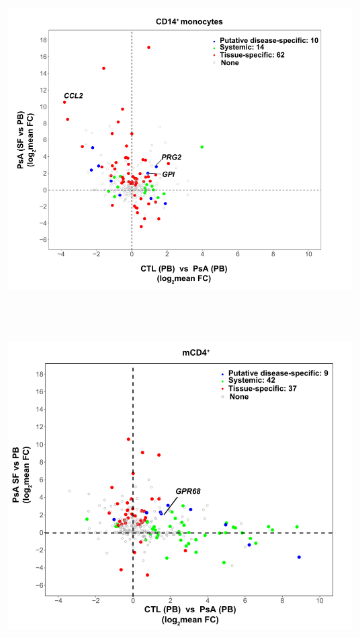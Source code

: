\begin{figure}[htbp]
\centering
\begin{subfigure}{0.6\textwidth}
\centering
\includegraphics[width=\textwidth]{./Results3/pdfs/PSA_array_correlation_CD14_FC_HVPsA_vs_SFPBPsA_t}
\caption{\textbf{}}
\end{subfigure} \\
\begin{subfigure}{0.6\textwidth}
\centering
\includegraphics[width=\textwidth]{./Results3/pdfs/PSA_array_correlation_CD4_FC_HVPsA_vs_SFPBPsA}

\end{subfigure}
\end{figure}
